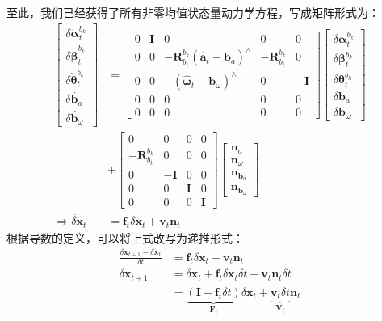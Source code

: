 至此，我们已经获得了所有非零均值状态量动力学方程，写成矩阵形式为：
\begin{equation}
\begin{aligned}
\left[\begin{array}{c}
\delta\dot{\bm{\alpha}}_t^{b_k}\\\delta\dot{\bm{\beta}}_t^{b_k}\\\delta\dot{\bm{\theta}}_t^{b_k}\\
\delta\dot{\bm{b}_a}\\\delta\dot{\bm{b}_\omega}
\end{array}\right]&=\left[\begin{matrix}
0 & \bm{I} & 0 & 0 & 0\\
0 & 0 & -\bm{R}_{b_t}^{b_k}\left(\hat{\bm{a}}_t-\bm{b}_a\right)^\wedge & -\bm{R}_{b_t}^{b_k} & 0\\
0 & 0 & -\left(\hat{\bm{\omega}}_t-\bm{b}_\omega\right)^\wedge & 0 & -\bm{I}\\
0 & 0 & 0 & 0 & 0\\
0 & 0 & 0 & 0 & 0
\end{matrix}\right]\left[\begin{array}{c}
\delta\bm{\alpha}_t^{b_k}\\\delta\bm{\beta}_t^{b_k}\\\delta\bm{\theta}_t^{b_k}\\
\delta\bm{b}_a\\\delta\bm{b}_\omega
\end{array}\right]\\
&+\left[\begin{matrix}
0 & 0 & 0 & 0\\
-\bm{R}_{b_t}^{b_k} & 0 & 0 & 0\\
0 & -\bm{I} & 0 & 0\\
0 & 0 & \bm{I} & 0\\
0 & 0 & 0 & \bm{I}
\end{matrix}\right]\left[\begin{array}{c}
\bm{n}_a\\\bm{n}_\omega\\\bm{n}_{\bm{b}_a}\\\bm{n}_{\bm{b}_\omega}
\end{array}\right]\\
\Rightarrow\dot{\delta\bm{x}}_t&=\bm{f}_t\delta\bm{x}_t+\bm{v}_t\bm{n}_t
\end{aligned}\end{equation}
根据导数的定义，可以将上式改写为递推形式：
\begin{equation}
\begin{aligned}
\frac{\delta\bm{x}_{t+1}-\delta\bm{x}_t}{\delta t}&=\bm{f}_t\delta\bm{x}_t+\bm{v}_t\bm{n}_t\\
\delta\bm{x}_{t+1}&=\delta\bm{x}_t+\bm{f}_t\delta\bm{x}_t\delta t + \bm{v}_t\bm{n}_t\delta t\\
&=\underbrace{\left(\bm{I}+\bm{f}_t\delta t\right)}_{\bm{F}_t}\delta\bm{x}_t+\underbrace{\bm{v}_t\delta t}_{\bm{V}_t}\bm{n}_t
\end{aligned}
\end{equation}
